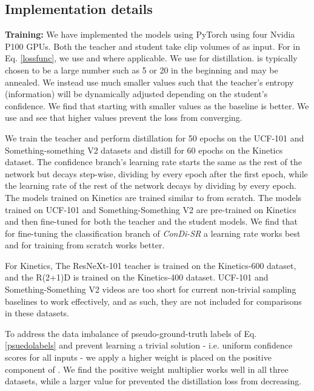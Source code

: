 \documentclass[a4paper,conference]{IEEEtran}
\begin{document}
\subsection{Implementation details}

{\bf Training:} We have implemented the models using PyTorch using four Nvidia P100 GPUs. Both the teacher and student take clip volumes of  as input. For  in Eq. \eqref{lossfunc}, we use  and  where applicable.  We use  for distillation.  is typically \cite{hinton2015distilling} chosen to be a large number such as 5 or 20 in the beginning and may be annealed. We instead use much smaller  values such that the teacher's entropy (information) will be dynamically adjusted depending on the student's confidence. We find that starting with smaller values as the baseline  is better. We use  and see that higher values prevent the loss from converging.

We train the teacher and perform distillation for 50 epochs on the UCF-101 and Something-something V2 datasets and distill for 60 epochs on the Kinetics dataset. The confidence branch's learning rate starts the same as the rest of the network but decays step-wise, dividing by  every epoch after the first epoch, while the learning rate of the rest of the network decays by dividing by  every epoch. The models trained on Kinetics are trained similar to \cite{Hara_2018_CVPR} from scratch. The models trained on UCF-101 and Something-Something V2 are pre-trained on Kinetics and then fine-tuned for both the teacher and the student models. We find that for fine-tuning the classification branch of \textit{ConDi-SR} a learning rate  works best and for training from scratch  works better.

For Kinetics, The ResNeXt-101 teacher is trained on the Kinetics-600 dataset, and the R(2+1)D is trained on the Kinetics-400 dataset. UCF-101 and Something-Something V2 videos are too short for current non-trivial sampling baselines \cite{korbar2019scsampler, gao2020listen} to work effectively, and as such, they are not included for comparisons in these datasets.

To address the data imbalance of pseudo-ground-truth labels of Eq. \ref{psuedolabels} and prevent learning a trivial solution - i.e. uniform confidence scores for all inputs - we apply a higher weight  is placed on the positive component of . We find the positive weight multiplier  works well in all three datasets, while a larger value for  prevented the distillation loss  from decreasing. 
 
\end{document}
